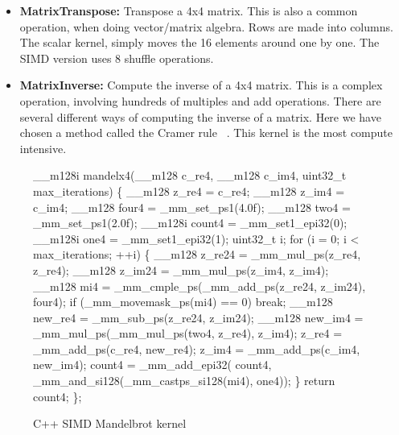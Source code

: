 \documentclass[preprint]{sigplanconf}
\begin{document}
\begin{itemize}
\item
\textbf{MatrixTranspose:} Transpose a 4x4 matrix.  This is also a common operation, when
doing vector/matrix algebra.  Rows are made into columns.  The scalar kernel, simply moves
the 16 elements around one by one.  The SIMD version uses 8 shuffle operations.

\item
\textbf{MatrixInverse:} Compute the inverse of a 4x4 matrix.  This is a complex operation,
involving hundreds of multiples and add operations.  There are several different ways
of computing the inverse of a matrix.  Here we have chosen a method called the Cramer rule
~\cite{cramer-rule}.  This kernel is the most compute intensive.

\end{itemize}

\begin{figure}
\begin{small}
\begin{program}[style=tt, number=true]
\_\_\tab{}m128i mandelx4(\tab{}\_\_m128 c\_re4, \_\_m128 c\_im4,
                uint32\_t max\_iterations) \{\untab{}
  \_\_m128  z\_re4  = c\_re4;
  \_\_m128  z\_im4  = c\_im4;
  \_\_m128  four4  = \_mm\_set\_ps1(4.0f);
  \_\_m128  two4   = \_mm\_set\_ps1(2.0f);
  \_\_m128i count4 = \_mm\_set1\_epi32(0);
  \_\_m128i one4   = \_mm\_set1\_epi32(1);
  uint32\_t i;
  fo\tab{}r (i = 0; i < max\_iterations; ++i) \{
    \_\_m128 z\_re24 = \_mm\_mul\_ps(z\_re4, z\_re4);
    \_\_m128 z\_im24 = \_mm\_mul\_ps(z\_im4, z\_im4);
    \_\_\tab{}m128 mi4      =
      \_mm\_cmple\_ps(\_mm\_add\_ps(z\_re24, z\_im24), four4);\untab{}
    if\tab{} (\_mm\_movemask\_ps(mi4) == 0)
      break;\untab{}
    \_\_m128 new\_re4 = \_mm\_sub\_ps(z\_re24, z\_im24);
    \_\_m128 new\_im4 = \_mm\_mul\_ps(\_mm\_mul\_ps(two4, z\_re4), z\_im4);
    z\_re4 = \_mm\_add\_ps(c\_re4, new\_re4);
    z\_im4 = \_mm\_add\_ps(c\_im4, new\_im4);
    co\tab{}unt4 = \_mm\_add\_epi32(
      count4, \_mm\_and\_si128(\_mm\_castps\_si128(mi4), one4));\untab{}\untab{}
  \}
  return count4;\untab{}
\};
\end{program}
\end{small}
\caption{C++ SIMD Mandelbrot kernel}
\label{fig:mandel-cpp}
\end{figure}
\end{document}
